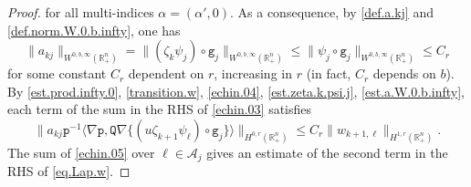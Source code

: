 \documentclass[10pt,a4paper]{amsart}
\newcommand{\R}{{\mathbb R}}
\renewcommand{\a}{\alpha}
\newcommand{\grad}{\nabla}
\newcommand{\la}{\langle}
\newcommand{\mA}{\mathcal{A}}
\newcommand{\ra}{\rangle}
\begin{document}
\begin{proof}
for all multi-indices $\a = (\a', 0)$. 
As a consequence, by \eqref{def.a.kj} and \eqref{def.norm.W.0.b.infty}, one has
\begin{equation}  \label{est.a.W.0.b.infty}
\| a_{kj} \|_{W^{0,b,\infty}(\R^n_+)}
= \| (\zeta_k \psi_j) \circ \mathtt g_j \|_{W^{0,b,\infty}(\R^n_+)}
\leq \| \psi_j \circ \mathtt g_j \|_{W^{0,b,\infty}(\R^n_+)} \leq C_r
\end{equation}
for some constant $C_r$ 
dependent on $r$, increasing in $r$ (in fact, $C_r$ depends on $b$).  
By \eqref{est.prod.infty.0}, \eqref{transition.w}, \eqref{echin.04}, 
\eqref{est.zeta.k.psi.j}, \eqref{est.a.W.0.b.infty}, 
each term of the sum in the RHS of \eqref{echin.03} satisfies 
\begin{equation}  \label{echin.05}
\| a_{kj} \mathtt p^{-1} \la \grad \mathtt p , \mathtt Q \grad 
\{ (u \zeta_{k+1} \psi_\ell) \circ \mathtt g_j \} \ra \|_{H^{0,r}(\R^n_+)}
\leq C_r \| w_{k+1,\ell} \|_{H^{1,r}(\R^n_+)}.
\end{equation}
The sum of \eqref{echin.05} over $\ell \in \mA_j$ gives an estimate 
of the second term in the RHS of \eqref{eq.Lap.w}.


\end{proof}
\end{document}
